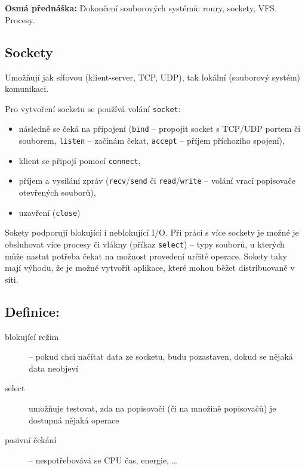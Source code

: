 \documentclass[a4paper, 11pt]{article}
\newcommand{\tcmd}[1]{\texttt{#1}}
\begin{document}
\newpage

\section{}
\textbf{Osmá přednáška:} Dokončení souborových systémů: roury, sockety, VFS. Procesy.

\subsection{Sockety}
Umožňují jak síťovou (klient-server, TCP, UDP), tak lokální (souborový systém) komunikaci.
 
Pro vytvoření socketu se používá volání \tcmd{socket}:
\begin{itemize}
    \item následně se čeká na připojení (\tcmd{bind} -- propojit socket s TCP/UDP portem či souborem, \tcmd{listen} -- začínám čekat, \tcmd{accept} -- příjem příchozího spojení),
    \item klient se připojí pomocí \tcmd{connect},
    \item příjem a vysílání zpráv (\tcmd{recv}/\tcmd{send} či \tcmd{read}/\tcmd{write} -- volání vrací popisovače otevřených souborů),
    \item uzavření (\tcmd{close})
\end{itemize}
 
Sokety podporují blokující i neblokující I/O. Při práci s více sockety je možné je obsluhovat více procesy či vlákny (příkaz \tcmd{select}) -- typy souborů, u kterých může nastat potřeba čekat na možnost provedení určité operace. Sokety taky mají výhodu, že je možné vytvořit aplikace, které mohou běžet distribuovaně v síti.
 
\subsection*{Definice:}
\begin{description}
\item[blokující režim] -- pokud chci načítat data ze socketu, budu pozastaven, dokud se nějaká data neobjeví

\item[select] umožňuje testovat, zda na popisovači (či na množině popisovačů) je dostupná nějaká operace 

\item[pasivní čekání] -- nespotřebovává se CPU čas, energie, \ldots
\end{description}
 
\end{document}
